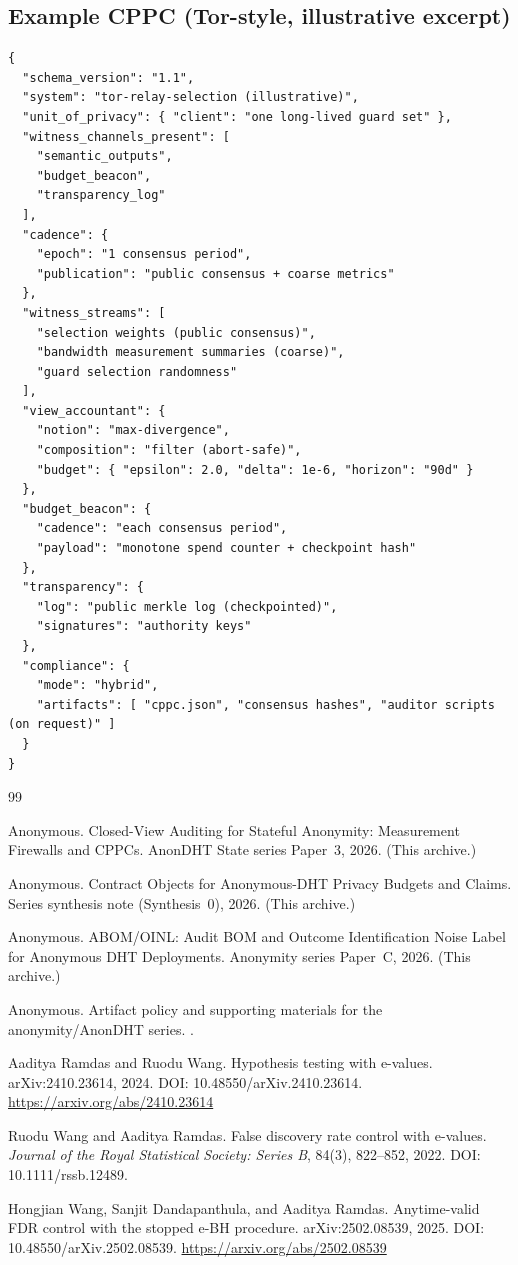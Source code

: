 \documentclass[11pt]{article}
\theoremstyle{definition}
\theoremstyle{remark}
\begin{document}
\subsection{Example CPPC (Tor-style, illustrative excerpt)}
\begin{lstlisting}
{
  "schema_version": "1.1",
  "system": "tor-relay-selection (illustrative)",
  "unit_of_privacy": { "client": "one long-lived guard set" },
  "witness_channels_present": [
    "semantic_outputs",
    "budget_beacon",
    "transparency_log"
  ],
  "cadence": {
    "epoch": "1 consensus period",
    "publication": "public consensus + coarse metrics"
  },
  "witness_streams": [
    "selection weights (public consensus)",
    "bandwidth measurement summaries (coarse)",
    "guard selection randomness"
  ],
  "view_accountant": {
    "notion": "max-divergence",
    "composition": "filter (abort-safe)",
    "budget": { "epsilon": 2.0, "delta": 1e-6, "horizon": "90d" }
  },
  "budget_beacon": {
    "cadence": "each consensus period",
    "payload": "monotone spend counter + checkpoint hash"
  },
  "transparency": {
    "log": "public merkle log (checkpointed)",
    "signatures": "authority keys"
  },
  "compliance": {
    "mode": "hybrid",
    "artifacts": [ "cppc.json", "consensus hashes", "auditor scripts (on request)" ]
  }
}
\end{lstlisting}







\begin{thebibliography}{99}

Anonymous.
\newblock Closed-View Auditing for Stateful Anonymity: Measurement Firewalls and CPPCs.
\newblock AnonDHT State series Paper~3, 2026. (This archive.)

Anonymous.
\newblock Contract Objects for Anonymous-DHT Privacy Budgets and Claims.
\newblock Series synthesis note (Synthesis~0), 2026. (This archive.)

Anonymous.
\newblock ABOM/OINL: Audit BOM and Outcome Identification Noise Label for Anonymous DHT Deployments.
\newblock Anonymity series Paper~C, 2026. (This archive.)

Anonymous.
\newblock Artifact policy and supporting materials for the anonymity/AnonDHT series.
.

Aaditya Ramdas and Ruodu Wang.
\newblock Hypothesis testing with e-values.
\newblock arXiv:2410.23614, 2024. DOI: 10.48550/arXiv.2410.23614.
\newblock \url{https://arxiv.org/abs/2410.23614}

Ruodu Wang and Aaditya Ramdas.
\newblock False discovery rate control with e-values.
\newblock \emph{Journal of the Royal Statistical Society: Series B}, 84(3), 822--852, 2022.
\newblock DOI: 10.1111/rssb.12489.

Hongjian Wang, Sanjit Dandapanthula, and Aaditya Ramdas.
\newblock Anytime-valid FDR control with the stopped e-BH procedure.
\newblock arXiv:2502.08539, 2025. DOI: 10.48550/arXiv.2502.08539.
\newblock \url{https://arxiv.org/abs/2502.08539}
\end{thebibliography}
\end{document}
